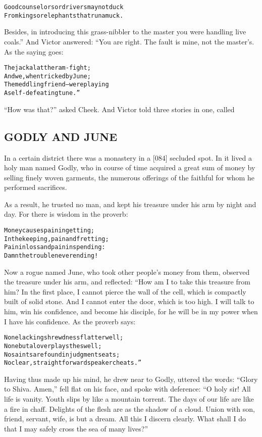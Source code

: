 \documentclass{article}
\renewenvironment{verbatim}{\begin{alltt}\normalfont\begin{centering}}{\end{centering}\end{alltt}}
\begin{document}
\begin{verbatim}
Good counselors or drivers may not duck
From kings or elephants that run amuck.
\end{verbatim}
Besides, in introducing this grass-nibbler to the master you were
handling live coals.” And Victor answered: “You are right. The
fault is mine, not the master's. As the saying goes:

\begin{verbatim}
The jackal at the ram-fight;
    And we, when tricked by June;
The meddling friend--were playing
    A self-defeating tune.”
\end{verbatim}
``How was that?'' asked Cheek. And Victor told three stories in
one, called

\subsection{GODLY AND JUNE}

In a certain district there was a monastery in a [084] secluded
spot. In it lived a holy man named Godly, who in course of time
acquired a great sum of money by selling finely woven garments, the
numerous offerings of the faithful for whom he performed
sacrifices.

As a result, he trusted no man, and kept his treasure under his arm
by night and day. For there is wisdom in the proverb:

\begin{verbatim}
Money causes pain in getting;
In the keeping, pain and fretting;
Pain in loss and pain in spending:
Damn the trouble never ending!
\end{verbatim}
Now a rogue named June, who took other people's money from them,
observed the treasure under his arm, and reflected: “How am I to
take this treasure from him? In the first place, I cannot pierce
the wall of the cell, which is compactly built of solid stone. And
I cannot enter the door, which is too high. I will talk to him, win
his confidence, and become his disciple, for he will be in my power
when I have his confidence. As the proverb says:

\begin{verbatim}
None lacking shrewdness flatter well;
None but a lover plays the swell;
No saints are found in judgment seats;
No clear, straightforward speaker cheats.”
\end{verbatim}
Having thus made up his mind, he drew near to Godly, uttered the
words: ``Glory to Shiva. Amen,'' fell flat on his face, and spoke
with deference:
``O holy sir! All life is vanity. Youth slips by like a mountain torrent. The days of our life are like a fire in chaff. Delights of the flesh are as the shadow of a cloud. Union with son, friend, servant, wife, is but a dream. All this I discern clearly. What shall I do that I may safely cross the sea of many lives?''
\end{document}
